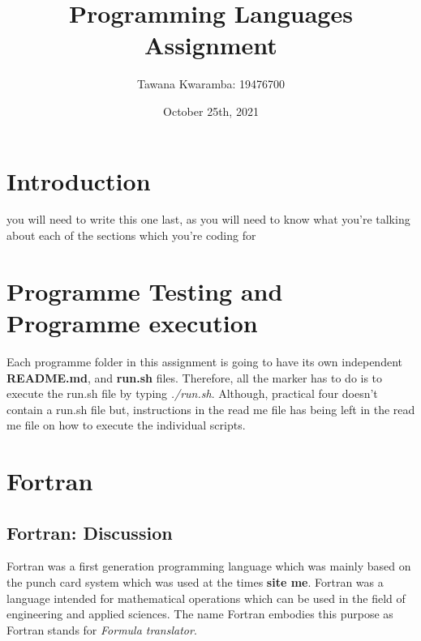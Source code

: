 \documentclass[
	12pt, %
]{fphw}
\title{Programming Languages Assignment} %
\author{Tawana Kwaramba: 19476700} %
\date{October 25th, 2021} %
\institute{Curtin University \\ Faculty of Science and Engineering: School of Electrical Engineering, computing and Math Science} %
\begin{document}
\maketitle
\newpage
\tableofcontents
\newpage
\listoffigures
\listoftables
\newpage

\section{Introduction}
you will need to write this one last, as you will need to know what you're
talking about each of the sections which you're coding for

\section{Programme Testing and Programme execution}
Each programme folder in this assignment is going to have its own independent
\textbf{README.md}, and \textbf{run.sh} files. Therefore, all the marker has to 
do is to execute the run.sh file by typing \emph{./run.sh}. Although, practical 
four doesn't contain a run.sh file but, instructions in the read me file has
being left in the read me file on how to execute the individual scripts.

\section{Fortran}

\subsection{Fortran: Discussion}
Fortran was a first generation programming language which was mainly based on
the punch card system which was used at the times \textbf{site me}.
Fortran was a language intended for mathematical operations which can be used
in the field of engineering and applied sciences. The name Fortran embodies this
purpose as Fortran stands for \emph{Formula translator}.\par
\end{document}
